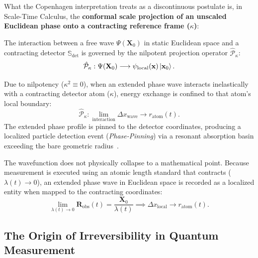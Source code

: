 What the Copenhagen interpretation treats as a discontinuous postulate is, in Scale-Time Calculus, the \textbf{conformal scale projection of an unscaled Euclidean phase onto a contracting reference frame ($\kappa$)}:
\begin{definition}
    \label{def:nilpotent_olcum}
    The interaction between a free wave $\Psi(\mathbf{X}_0)$ in static Euclidean space and a contracting detector $\mathbb{S}_{\mathrm{det}}$ is governed by the nilpotent projection operator $\hat{\mathcal{P}}_\kappa$:
    \begin{equation}
        \hat{\mathcal{P}}_\kappa : \Psi(\mathbf{X}_0) \longrightarrow \psi_{\mathrm{local}}(\mathbf{x}) \ket{\mathbf{x}_0}.
        \label{eq:izdusum_operatoru}
    \end{equation}
\end{definition}

Due to nilpotency ($\kappa^2 \equiv 0$), when an extended phase wave interacts inelastically with a contracting detector atom ($\kappa$), energy exchange is confined to that atom's local boundary:
\begin{equation}
    \hat{\mathcal{P}}_\kappa : \lim_{\mathrm{interaction}} \Delta x_{\mathrm{wave}} \to r_{\mathrm{atom}}(t).
    \label{eq:nilpotent_sonum}
\end{equation}
The extended phase profile is pinned to the detector coordinates, producing a localized particle detection event (\textit{Phase-Pinning}) via a resonant absorption basin exceeding the bare geometric radius~\cite{bohren1983}.

\begin{theorem}
    \label{thm:cokus_illuzyonu}
    The wavefunction does not physically collapse to a mathematical point. Because measurement is executed using an atomic length standard that contracts ($\lambda(t) \to 0$), an extended phase wave in Euclidean space is recorded as a localized entity when mapped to the contracting coordinates:
    \begin{equation}
        \lim_{\lambda(t) \to 0} \mathbf{R}_{\mathrm{obs}}(t) = \frac{\mathbf{X}_0}{\lambda(t)} \implies \Delta x_{\mathrm{local}} \to r_{\mathrm{atom}}(t).
        \label{eq:cokus_perspektif}
    \end{equation}
\end{theorem}

\subsection{The Origin of Irreversibility in Quantum Measurement}
\label{sec:geri_donussuzluk_zamani}

